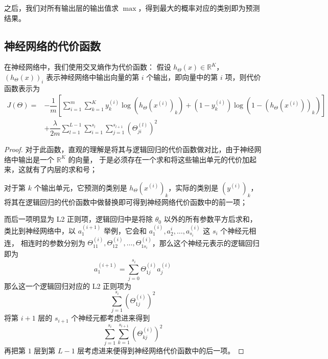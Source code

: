 之后，我们对所有输出层的输出值求 $\max$，得到最大的概率对应的类别即为预测结果。

\subsection{神经网络的代价函数}
在神经网络中，我们使用交叉熵作为代价函数：
假设 $h_\Theta(x) \in \mathbb{R}^K$，
$\left(h_\Theta(x)\right)_i$ 表示神经网络中输出向量的第 $i$ 个输出，即向量中的第 $i$ 项，则代价函数表示为
\begin{equation}
    \begin{aligned}
        J(\Theta) = &-\dfrac 1m\left[\sum\limits_{i=1}^m{\sum\limits_{k=1}^K{y_k^{(i)}\log (h_\Theta(x^{(i)})_k) + (1 - y_k^{(i)}) \log (1 - (h_\Theta(x^{(i)}))_k)}}\right] \\ 
        &+ \dfrac \lambda{2m}\sum\limits_{l=1}^{L-1}{\sum\limits_{i=1}^{s_l}{\sum\limits_{j=1}^{s_{l+1}}\left(\Theta_{ji}^{(l)}\right)^2}}
    \end{aligned}
\end{equation}

\begin{proof}
对于此函数，直观的理解是将其与逻辑回归的代价函数做对比，由于神经网络中输出是一个 $\mathbb{R}^K$ 的向量，
于是必须存在一个求和将这些输出单元的代价加起来，这就有了内层的求和号；

对于第 $k$ 个输出单元，它预测的类别是 $h_\Theta(x^{(i)})_k$，实际的类别是 $(y^{(i)})_k$，
将其在逻辑回归的代价函数中做替换即可得到神经网络代价函数中的前一项；

而后一项明显为 L2 正则项，逻辑回归中是将除 $\theta_0$ 以外的所有参数平方后求和，
类比到神经网络中，以 $a_1^{(i+1)}$ 举例，它会和 $a_1^{(i)}, a_2^{i}, \dots, a_{s_{i}}^{(i)}$ 这 $s_{i}$ 个神经元相连，
相连时的参数分别为 $\Theta_{11}^{(i)}, \Theta_{12}^{(i)}, \dots, \Theta_{1s_i}^{(i)}$，那么这个神经元表示的逻辑回归即为
\begin{equation}
    a_1^{(i+1)} = \sum\limits_{j=0}^{s_i}{\Theta_{1j}^{(i)}a_j^{(i)}}
\end{equation}
那么这一个逻辑回归对应的 L2 正则项为
\begin{equation}
    \sum\limits_{j=1}^{s_i}\left({\Theta_{1j}^{(i)}}\right)^2
\end{equation}
将第 $i+1$ 层的 $s_{i+1}$ 个神经元都考虑进来得到
\begin{equation}
    \sum\limits_{j=1}^{s_i}{\sum\limits_{k=1}^{s_{i+1}}\left({\Theta_{kj}^{(i)}}\right)^2}
\end{equation}
再把第 $1$ 层到第 $L-1$ 层考虑进来便得到神经网络代价函数中的后一项。
\end{proof}

